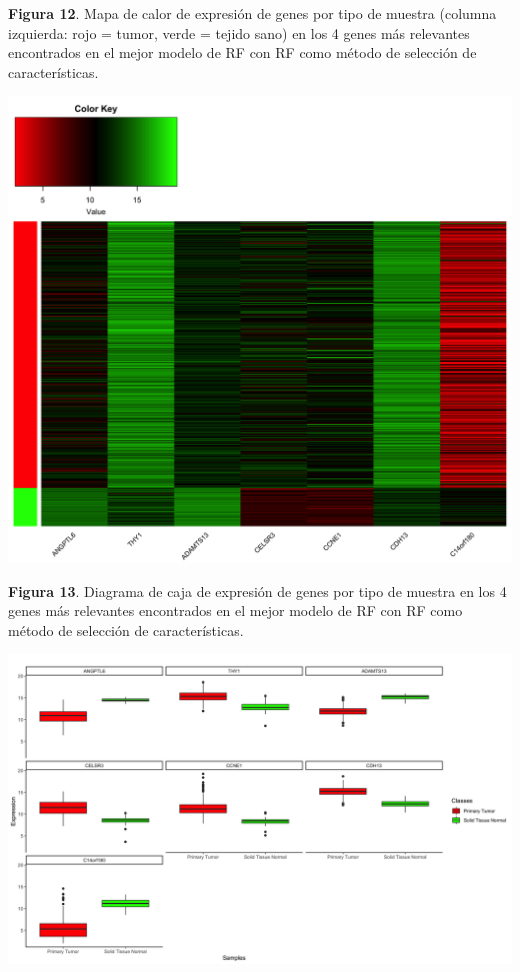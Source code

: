 \begin{center}
\textbf{Figura 12}. Mapa de calor de expresión de genes por tipo de muestra (columna izquierda: rojo = tumor, verde = tejido sano) en los 4 genes más relevantes encontrados en el mejor modelo de RF con RF como método de selección de características.
\end{center}
\begin{center}
	\includegraphics[width=1\textwidth]{figuras/12_higado_biclase_29_rf_heatmap_mejor_metodo.png} 
\end{center}

\newpage
\begin{center}
	\textbf{Figura 13}. Diagrama de caja de expresión de genes por tipo de muestra en los 4 genes más relevantes encontrados en el mejor modelo de RF con RF como método de selección de características.
\end{center}
\begin{center}
	\includegraphics[width=1\textwidth]{figuras/13_higado_biclase_30_rf_boxplots_mejor_metodo.png} 
\end{center}

